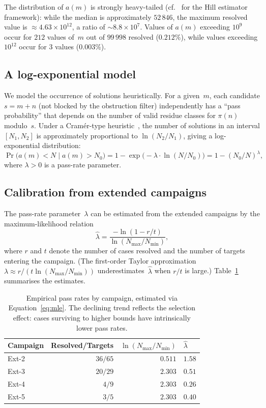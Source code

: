 \documentclass[11pt]{article}
\theoremstyle{definition}
\theoremstyle{remark}
\numberwithin{equation}{section}
\begin{document}
The distribution of $a(m)$ is strongly heavy-tailed
(cf.~\cite{Hill1975} for the Hill estimator framework): while the
median is approximately $52\,846$, the maximum resolved value is
$\approx 4.63 \times 10^{12}$, a ratio of $\sim 8.8 \times 10^7$.
Values of $a(m)$ exceeding $10^9$ occur for $212$ values of~$m$
out of $99\,998$ resolved ($0.212\%$), while values exceeding
$10^{12}$ occur for $3$ values ($0.003\%$).

\subsection{A log-exponential model}

We model the occurrence of solutions heuristically.
For a given~$m$, each candidate $s = m + n$ (not blocked by the
obstruction filter) independently has a ``pass probability'' that
depends on the number of valid residue classes for $\pi(n)$
modulo~$s$.  Under a Cram\'er-type heuristic~\cite{Cramer1936,Granville1995},
the number of
solutions in an interval $[N_1, N_2]$ is approximately proportional
to $\ln(N_2/N_1)$, giving a log-exponential distribution:
\begin{equation}\label{eq:logexp}
\Pr\bigl(a(m) < N \mid a(m) > N_0\bigr)
= 1 - \exp\bigl(-\lambda \cdot \ln(N/N_0)\bigr)
= 1 - (N_0/N)^{\lambda},
\end{equation}
where $\lambda > 0$ is a pass-rate parameter.

\subsection{Calibration from extended campaigns}

The pass-rate parameter~$\lambda$ can be estimated from the
extended campaigns by the maximum-likelihood relation
\begin{equation}\label{eq:mle}
\hat\lambda = \frac{-\ln(1 - r/t)}{\ln(N_{\max}/N_{\min})},
\end{equation}
where $r$ and $t$ denote the number of cases resolved and the
number of targets entering the campaign.
(The first-order Taylor approximation
$\lambda \approx r / (t \ln(N_{\max}/N_{\min}))$
underestimates~$\hat\lambda$ when $r/t$ is large.)
Table~\ref{tab:passrate} summarises the estimates.

\begin{table}[ht]
\centering
\caption{Empirical pass rates by campaign, estimated via
Equation~\eqref{eq:mle}.  The declining
trend reflects the selection effect: cases surviving to higher
bounds have intrinsically lower pass rates.}
\label{tab:passrate}
\begin{tabular}{lrrl}
\toprule
Campaign & Resolved/Targets & $\ln(N_{\max}/N_{\min})$ &
  $\hat\lambda$ \\
\midrule
Ext-2 & $36/65$  & $0.511$ & $1.58$ \\
Ext-3 & $20/29$  & $2.303$ & $0.51$ \\
Ext-4 & $4/9$    & $2.303$ & $0.26$ \\
Ext-5 & $3/5$    & $2.303$ & $0.40$ \\
\bottomrule
\end{tabular}
\end{table}
\end{document}
